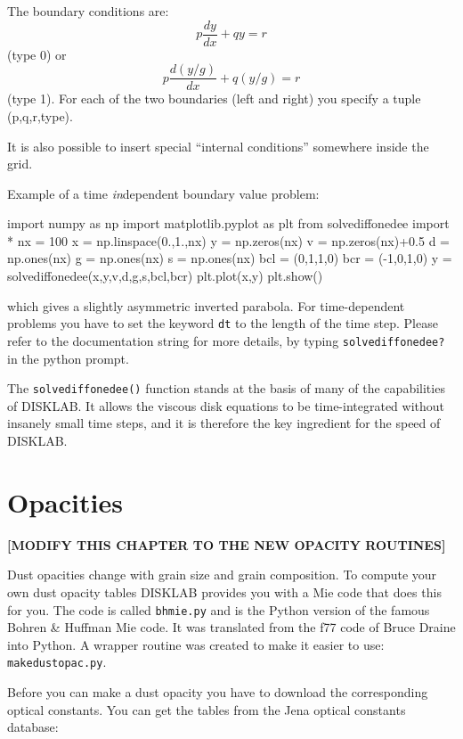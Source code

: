 \documentclass{book}
\newcommand{\code}[1]{{\small\tt #1}}
\begin{document}
The boundary conditions are:
\begin{equation}
p\frac{dy}{dx} + qy = r
\end{equation}
(type 0) or
\begin{equation}
p\frac{d(y/g)}{dx} + q(y/g) = r
\end{equation}
(type 1). For each of the two boundaries (left and right) you specify a tuple
(p,q,r,type).

It is also possible to insert special ``internal conditions'' somewhere inside
the grid.

Example of a time {\em in}dependent boundary value problem:
\begin{codebox}
import numpy as np
import matplotlib.pyplot as plt
from solvediffonedee import *
nx  = 100
x   = np.linspace(0.,1.,nx)
y   = np.zeros(nx)
v   = np.zeros(nx)+0.5
d   = np.ones(nx)
g   = np.ones(nx)
s   = np.ones(nx)
bcl = (0,1,1,0)
bcr = (-1,0,1,0)
y   = solvediffonedee(x,y,v,d,g,s,bcl,bcr)
plt.plot(x,y)
plt.show()
\end{codebox}
which gives a slightly asymmetric inverted parabola. For time-dependent problems
you have to set the keyword \code{dt} to the length of the time step. Please
refer to the documentation string for more details, by typing
\code{solvediffonedee?} in the python prompt.

The \code{solvediffonedee()} function stands at the basis of many of the
capabilities of {\sf DISKLAB}. It allows the viscous disk equations to be
time-integrated without insanely small time steps, and it is therefore the
key ingredient for the speed of {\sf DISKLAB}.

\chapter{Opacities}
\label{app-opacities}

{\bf [MODIFY THIS CHAPTER TO THE NEW OPACITY ROUTINES]}

Dust opacities change with grain size and grain composition. To compute
your own dust opacity tables {\sf DISKLAB} provides you with a Mie code
that does this for you. The code is called \code{bhmie.py} and is the
Python version of the famous Bohren \& Huffman Mie code. It was translated
from the f77 code of Bruce Draine into Python. A wrapper routine was
created to make it easier to use: \code{makedustopac.py}.

Before you can make a dust opacity you have to download the corresponding
optical constants. You can get the tables from the Jena optical constants
database:
\end{document}
